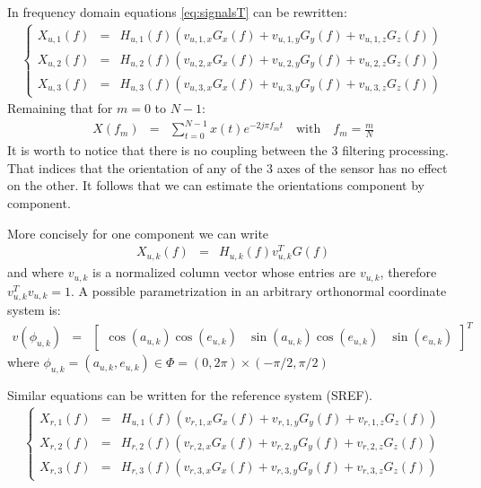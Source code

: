 \documentclass[a4paper, 12pt]{report}
\begin{document}
In frequency domain equations \eqref{eq:signalsT} can be rewritten:
\begin{eqnarray}
\label{eq:signalsF}
\left\{
\begin{array}{rcl}
X_{u,1}(f)&=&H_{u,1}(f) (v_{u,1,x}G_{x}(f)+v_{u,1,y}G_{y}(f)+v_{u,1,z}G_{z}(f))
\\
X_{u,2}(f)&=&H_{u,2}(f) (v_{u,2,x}G_{x}(f)+v_{u,2,y}G_{y}(f)+v_{u,2,z}G_{z}(f))
\\
X_{u,3}(f)&=&H_{u,3}(f) (v_{u,3,x}G_{x}(f)+v_{u,3,y}G_{y}(f)+v_{u,3,z}G_{z}(f))
\end{array}
\right.
\end{eqnarray}
Remaining that for $m=0$ to $N-1$:
\begin{eqnarray*}
X(f_{m})&=&\sum_{t=0}^{N-1}x(t)e^{-2j\pi f_{m}t}\quad \mathrm{with}\quad f_{m}=\frac{m}{N} 
\end{eqnarray*}
It is worth to notice that there is no coupling between the 3 filtering processing. That indices that the orientation of any of the 3 axes of the sensor has no effect on the other. It follows that we can estimate the orientations component by component.

More concisely for one component we can write
\begin{eqnarray*}
X_{u,k}(f)&=&H_{u,k}(f)v_{u,k}^{T}G(f)
\end{eqnarray*}
and where $v_{u,k}$ is a normalized column vector whose entries are $v_{u,k}$, therefore $v_{u,k}^{T}v_{u,k}=1$.  A possible parametrization in an arbitrary orthonormal coordinate system is:
\begin{eqnarray}
\label{eq:parametricformofV}
v(\phi_{u,k})&=&
\begin{bmatrix}
\cos(a_{u,k})\cos(e_{u,k})&\sin(a_{u,k})\cos(e_{u,k})&\sin(e_{u,k})
\end{bmatrix}^{T}
\end{eqnarray}
where $\phi_{u,k}=(a_{u,k},e_{u,k})\in\Phi= (0,2\pi)\times (-\pi/2,\pi/2)$

 \bigskip
Similar equations can be written for the reference system (SREF). 
\begin{eqnarray}
\label{eq:signalsF}
\left\{
\begin{array}{rcl}
X_{r,1}(f)&=&H_{u,1}(f) (v_{r,1,x}G_{x}(f)+v_{r,1,y}G_{y}(f)+v_{r,1,z}G_{z}(f))
\\
X_{r,2}(f)&=&H_{r,2}(f) (v_{r,2,x}G_{x}(f)+v_{r,2,y}G_{y}(f)+v_{r,2,z}G_{z}(f))
\\
X_{r,3}(f)&=&H_{r,3}(f) (v_{r,3,x}G_{x}(f)+v_{r,3,y}G_{y}(f)+v_{r,3,z}G_{z}(f))
\end{array}
\right.
\end{eqnarray}
\end{document}
